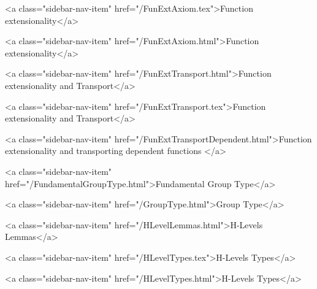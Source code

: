       
    
      
        
          <a class="sidebar-nav-item" href="/FunExtAxiom.tex">Function extensionality</a>
        
      
    
      
        
          <a class="sidebar-nav-item" href="/FunExtAxiom.html">Function extensionality</a>
        
      
    
      
        
          <a class="sidebar-nav-item" href="/FunExtTransport.html">Function extensionality and Transport</a>
        
      
    
      
        
          <a class="sidebar-nav-item" href="/FunExtTransport.tex">Function extensionality and Transport</a>
        
      
    
      
        
          <a class="sidebar-nav-item" href="/FunExtTransportDependent.html">Function extensionality and transporting dependent functions </a>
        
      
    
      
        
          <a class="sidebar-nav-item" href="/FundamentalGroupType.html">Fundamental Group Type</a>
        
      
    
      
        
          <a class="sidebar-nav-item" href="/GroupType.html">Group Type</a>
        
      
    
      
        
          <a class="sidebar-nav-item" href="/HLevelLemmas.html">H-Levels Lemmas</a>
        
      
    
      
        
          <a class="sidebar-nav-item" href="/HLevelTypes.tex">H-Levels Types</a>
        
      
    
      
        
          <a class="sidebar-nav-item" href="/HLevelTypes.html">H-Levels Types</a>
        
      
    
      
        
